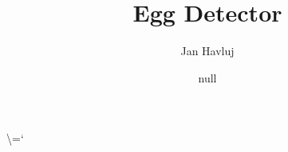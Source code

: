 \usepackage{color}
\usepackage{ifthen}
\usepackage{ifpdf}
\usepackage[headings]{fullpage}
\usepackage{listings}
\lstset{language=Java,breaklines=true}
\ifpdf
\else
  \usepackage[dvips]{graphicx}
\fi

\newcommand{\entityintro}[2]{%
  \hbox to \hsize{%
    \vbox{%
      \hbox to .2in{}%
    }%
    { #1}%
    \dotfill\pageref{#2}%
  }
}
\newcommand{\refdefined}[1]{
\expandafter\ifx\csname r@#1\endcsname\relax
\relax\else
{$($in \ref{#1}, page \pageref{#1}$)$}\fi}
\date{null}
\title{Egg Detector}
\author{Jan Havluj}
\chardef\textbackslash=`\\
